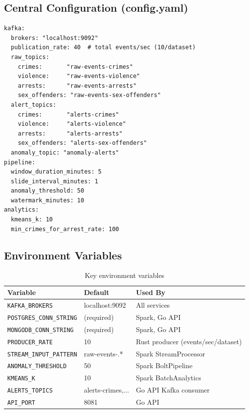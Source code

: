 \documentclass[12pt,a4paper]{article}
\begin{document}
\subsection{Central Configuration (config.yaml)}

\begin{lstlisting}[caption={config.yaml --- central pipeline configuration}]
kafka:
  brokers: "localhost:9092"
  publication_rate: 40  # total events/sec (10/dataset)
  raw_topics:
    crimes:       "raw-events-crimes"
    violence:     "raw-events-violence"
    arrests:      "raw-events-arrests"
    sex_offenders: "raw-events-sex-offenders"
  alert_topics:
    crimes:       "alerts-crimes"
    violence:     "alerts-violence"
    arrests:      "alerts-arrests"
    sex_offenders: "alerts-sex-offenders"
  anomaly_topic: "anomaly-alerts"
pipeline:
  window_duration_minutes: 5
  slide_interval_minutes: 1
  anomaly_threshold: 50
  watermark_minutes: 10
analytics:
  kmeans_k: 10
  min_crimes_for_arrest_rate: 100
\end{lstlisting}

\subsection{Environment Variables}

\begin{table}[H]
\centering
\caption{Key environment variables}
\begin{tabularx}{\textwidth}{l l X}
\toprule
\textbf{Variable} & \textbf{Default} & \textbf{Used By} \\
\midrule
\texttt{KAFKA\_BROKERS} & localhost:9092 & All services \\
\texttt{POSTGRES\_CONN\_STRING} & (required) & Spark, Go API \\
\texttt{MONGODB\_CONN\_STRING} & (required) & Spark, Go API \\
\texttt{PRODUCER\_RATE} & 10 & Rust producer (events/sec/dataset) \\
\texttt{STREAM\_INPUT\_PATTERN} & raw-events-.* & Spark StreamProcessor \\
\texttt{ANOMALY\_THRESHOLD} & 50 & Spark BoltPipeline \\
\texttt{KMEANS\_K} & 10 & Spark BatchAnalytics \\
\texttt{ALERTS\_TOPICS} & alerts-crimes,... & Go API Kafka consumer \\
\texttt{API\_PORT} & 8081 & Go API \\
\bottomrule
\end{tabularx}
\end{table}
\end{document}
